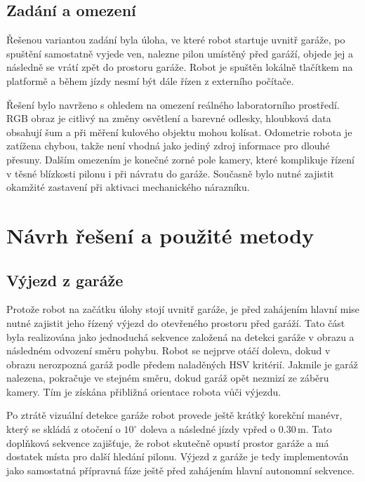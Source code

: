 \documentclass[a4paper,11pt]{article}
\begin{document}
\subsection{Zadání a omezení}
Řešenou variantou zadání byla úloha, ve které robot startuje uvnitř garáže, po spuštění samostatně vyjede ven, nalezne pilon umístěný před garáží, objede jej a následně se vrátí zpět do prostoru garáže. Robot je spuštěn lokálně tlačítkem na platformě a během jízdy nesmí být dále řízen z externího počítače.

Řešení bylo navrženo s ohledem na omezení reálného laboratorního prostředí. RGB obraz je citlivý na změny osvětlení a barevné odlesky, hloubková data obsahují šum a při měření kulového objektu mohou kolísat. Odometrie robota je zatížena chybou, takže není vhodná jako jediný zdroj informace pro dlouhé přesuny. Dalším omezením je konečné zorné pole kamery, které komplikuje řízení v těsné blízkosti pilonu i při návratu do garáže. Současně bylo nutné zajistit okamžité zastavení při aktivaci mechanického nárazníku.

\section{Návrh řešení a použité metody}

\subsection{Výjezd z garáže}
Protože robot na začátku úlohy stojí uvnitř garáže, je před zahájením hlavní mise nutné zajistit jeho řízený výjezd do otevřeného prostoru před garáží. Tato část byla realizována jako jednoduchá sekvence založená na detekci garáže v obrazu a následném odvození směru pohybu. Robot se nejprve otáčí doleva, dokud v obrazu nerozpozná garáž podle předem naladěných HSV kritérií. Jakmile je garáž nalezena, pokračuje ve stejném směru, dokud garáž opět nezmizí ze záběru kamery. Tím je získána přibližná orientace robota vůči výjezdu.

Po ztrátě vizuální detekce garáže robot provede ještě krátký korekční manévr, který se skládá z otočení o $10^\circ$ doleva a následné jízdy vpřed o $0.30\,\mathrm{m}$. Tato doplňková sekvence zajišťuje, že robot skutečně opustí prostor garáže a má dostatek místa pro další hledání pilonu. Výjezd z garáže je tedy implementován jako samostatná přípravná fáze ještě před zahájením hlavní autonomní sekvence.
\end{document}
